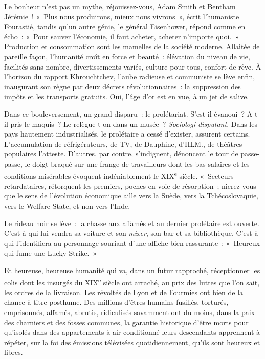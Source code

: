 \documentclass[french,twoside]{book} %
\begin{document}
\noindent Le bonheur n’est pas un mythe, réjouissez-vous, Adam Smith et Bentham Jérémie ! « Plus nous produirons, mieux nous vivrons », écrit l’humaniste Fourastié, tandis qu’un autre génie, le général Eisenhower, répond comme en écho : « Pour sauver l’économie, il faut acheter, acheter n’importe quoi. » Production et consommation sont les mamelles de la société moderne. Allaitée de pareille façon, l’humanité croît en force et beauté : élévation du niveau de vie, facilités sans nombre, divertissements variés, culture pour tous, confort de rêve. À l’horizon du rapport Khrouchtchev, l’aube radieuse et communiste se lève enfin, inaugurant son règne par deux décrets révolutionnaires : la suppression des impôts et les transports gratuits. Oui, l’âge d’or est en vue, à un jet de salive.\par
Dans ce bouleversement, un grand disparu : le prolétariat. S’est-il évanoui ? A-t-il pris le maquis ? Le relègue-t-on dans un musée ? \emph{Sociologi disputant}. Dans les pays hautement industrialisés, le prolétaire a cessé d’exister, assurent certains. L’accumulation de réfrigérateurs, de TV, de Dauphine, d’HLM., de théâtres populaires l’atteste. D’autres, par contre, s’indignent, dénoncent le tour de passe-passe, le doigt braqué sur une frange de travailleurs dont les bas salaires et les conditions misérables évoquent indéniablement le XIX\textsuperscript{e} siècle. « Secteurs retardataires, rétorquent les premiers, poches en voie de résorption ; nierez-vous que le sens de l’évolution économique aille vers la Suède, vers la Tchécoslovaquie, vers le Welfare State, et non vers l’Inde.\par
Le rideau noir se lève : la chasse aux affamés et au dernier prolétaire est ouverte. C’est à qui lui vendra sa voiture et son \emph{mixer}, son bar et sa bibliothèque. C’est à qui l’identifiera au personnage souriant d’une affiche bien rassurante : « Heureux qui fume une Lucky Strike. »\par
Et heureuse, heureuse humanité qui va, dans un futur rapproché, réceptionner les colis dont les insurgés du XIX\textsuperscript{e} siècle ont arraché, au prix des luttes que l’on sait, les ordres de la livraison. Les révoltés de Lyon et de Fourmies ont bien de la chance à titre posthume. Des millions d’êtres humains fusillés, torturés, emprisonnés, affamés, abrutis, ridiculisés savamment ont du moins, dans la paix des charniers et des fosses communes, la garantie historique d’être morts pour qu’isolés dans des appartements à air conditionné leurs descendants apprennent à répéter, sur la foi des émissions télévisées quotidiennement, qu’ils sont heureux et libres.\par
\end{document}
